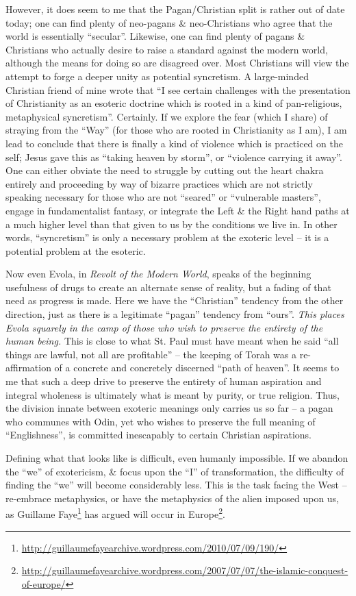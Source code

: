 However, it does seem to me that the Pagan/Christian split is rather out of date today; one can find plenty of neo-pagans \& neo-Christians who agree that the world is essentially ``secular''. Likewise, one can find plenty of pagans \& Christians who actually desire to raise a standard against the modern world, although the means for doing so are disagreed over. Most Christians will view the attempt to forge a deeper unity as potential syncretism. A large-minded Christian friend of mine wrote that ``I see certain challenges with the presentation of Christianity as an esoteric doctrine which is rooted in a kind of pan-religious, metaphysical syncretism''. Certainly. If we explore the fear (which I share) of straying from the ``Way'' (for those who are rooted in Christianity as I am), I am lead to conclude that there is finally a kind of violence which is practiced on the self; Jesus gave this as ``taking heaven by storm'', or ``violence carrying it away''. One can either obviate the need to struggle by cutting out the heart chakra entirely and proceeding by way of bizarre practices which are not strictly speaking necessary for those who are not ``seared'' or ``vulnerable masters'', engage in fundamentalist fantasy, or integrate the Left \& the Right hand paths at a much higher level than that given to us by the conditions we live in. In other words, ``syncretism'' is only a necessary problem at the exoteric level -- it is a potential problem at the esoteric.

Now even Evola, in \emph{Revolt of the Modern World}, speaks of the beginning usefulness of drugs to create an alternate sense of reality, but a fading of that need as progress is made. Here we have the ``Christian'' tendency from the other direction, just as there is a legitimate ``pagan'' tendency from ``ours''. \emph{This places Evola squarely in the camp of those who wish to preserve the entirety of the human being.} This is close to what St. Paul must have meant when he said ``all things are lawful, not all are profitable'' -- the keeping of Torah was a re-affirmation of a concrete and concretely discerned ``path of heaven''. It seems to me that such a deep drive to preserve the entirety of human aspiration and integral wholeness is ultimately what is meant by purity, or true religion. Thus, the division innate between exoteric meanings only carries us so far -- a pagan who communes with Odin, yet who wishes to preserve the full meaning of ``Englishness'', is committed inescapably to certain Christian aspirations.

Defining what that looks like is difficult, even humanly impossible. If we abandon the ``we'' of exotericism, \& focus upon the ``I'' of transformation, the difficulty of finding the ``we'' will become considerably less. This is the task facing the West -- re-embrace metaphysics, or have the metaphysics of the alien imposed upon us, as Guillame Faye\footnote{\url{http://guillaumefayearchive.wordpress.com/2010/07/09/190/}} has argued will occur in Europe\footnote{\url{http://guillaumefayearchive.wordpress.com/2007/07/07/the-islamic-conquest-of-europe/}}.

